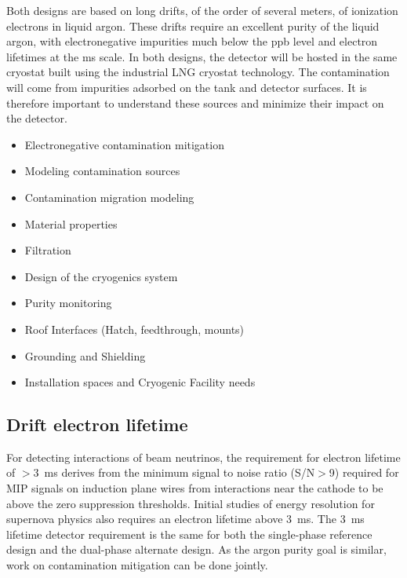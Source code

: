 Both designs are based on long drifts, of the order of several meters,
of ionization electrons in liquid argon. These drifts require an
excellent purity of the liquid argon, with electronegative impurities
much below the ppb level and electron lifetimes at the ms scale. In
both designs, the detector will be hosted in the same cryostat built
using the industrial LNG cryostat technology. The contamination will
come from impurities adsorbed on the tank and detector surfaces. It is
therefore important to understand these sources and minimize their
impact on the detector.
\begin{itemize}
\item Electronegative contamination mitigation	
\item Modeling contamination sources
\item Contamination migration modeling
\item Material properties
\item Filtration	
\item Design of the cryogenics system
\item Purity monitoring	
\item Roof Interfaces (Hatch, feedthrough, mounts)	
\item Grounding	and Shielding
\item Installation spaces and Cryogenic Facility needs	
\end{itemize}

\subsection{Drift electron lifetime}
\label{sec:detectors-synergy-lifetime}

For detecting interactions of beam neutrinos, the requirement for
electron lifetime of $>$3~ms derives from the minimum signal to noise
ratio (S/N$>$9) required for MIP signals on induction plane wires from
interactions near the cathode to be above the zero suppression
thresholds.  Initial studies of energy resolution for supernova physics
also requires an electron lifetime above 3~ms.  The 3~ms lifetime
detector requirement is the same for both the single-phase reference
design and the dual-phase alternate design.  As the argon purity goal
is similar, work on contamination mitigation can be done jointly.


